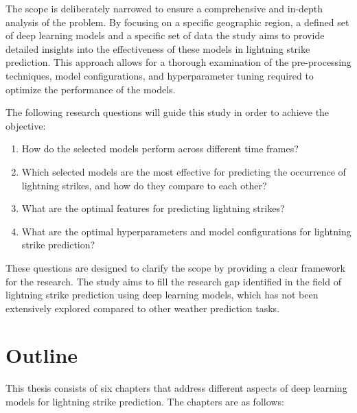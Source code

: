 The scope is deliberately narrowed to ensure a comprehensive and in-depth analysis of the problem. By focusing on a specific geographic region, a defined set of deep learning models and a specific set of data the study aims to provide detailed insights into the effectiveness of these models in lightning strike prediction. This approach allows for a thorough examination of the pre-processing techniques, model configurations, and hyperparameter tuning required to optimize the performance of the models.

The following research questions will guide this study in order to achieve the objective:

\begin{enumerate}
	\item How do the selected models perform across different time frames?
	\item Which selected models are the most effective for predicting the occurrence of lightning strikes, and how do they compare to each other?
	\item What are the optimal features for predicting lightning strikes?
	\item What are the optimal hyperparameters and model configurations for lightning strike prediction?
\end{enumerate}

These questions are designed to clarify the scope by providing a clear framework for the research. The study aims to fill the research gap identified in the field of lightning strike prediction using deep learning models, which has not been extensively explored compared to other weather prediction tasks.

\newpage
\section{Outline}

This thesis consists of six chapters that address different aspects of deep learning models for lightning strike prediction. The chapters are as follows:

